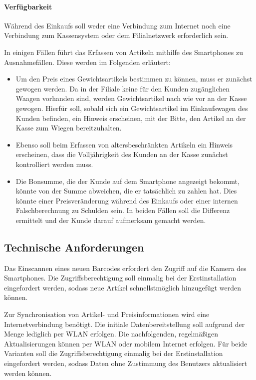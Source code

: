 \paragraph{Verfügbarkeit}
Während des Einkaufs soll weder eine Verbindung zum Internet noch eine Verbindung zum Kassensystem oder dem Filialnetzwerk erforderlich sein. 

In einigen Fällen führt das Erfassen von Artikeln mithilfe des Smartphones zu Ausnahmefällen. Diese werden im Folgenden erläutert:

\begin{itemize}
	\item Um den Preis eines Gewichtsartikels bestimmen zu können, muss er zunächst gewogen werden. Da in der Filiale keine für den Kunden zugänglichen Waagen vorhanden sind, werden Gewichtsartikel nach wie vor an der Kasse gewogen. Hierfür soll, sobald sich ein Gewichtsartikel im Einkaufswagen des Kunden befinden, ein Hinweis erscheinen, mit der Bitte, den Artikel an der Kasse zum Wiegen bereitzuhalten.
	\item Ebenso soll beim Erfassen von altersbeschränkten Artikeln ein Hinweis erscheinen, dass die Volljährigkeit des Kunden an der Kasse zunächst kontrolliert werden muss.
	\item Die Bonsumme, die der Kunde auf dem Smartphone angezeigt bekommt, könnte von der Summe abweichen, die er tatsächlich zu zahlen hat. Dies könnte einer Preisveränderung während des Einkaufs oder einer internen Falschberechnung zu Schulden sein. In beiden Fällen soll die Differenz ermittelt und der Kunde darauf aufmerksam gemacht werden.
\end{itemize}

\subsection{Technische Anforderungen}
Das Einscannen eines neuen Barcodes erfordert den Zugriff auf die Kamera des Smartphones. Die Zugriffsberechtigung soll einmalig bei der Erstinstallation eingefordert werden, sodass neue Artikel schnellstmöglich hinzugefügt werden können.

Zur Synchronisation von Artikel- und Preisinformationen wird eine Internetverbindung benötigt. Die initiale Datenbereitstellung soll aufgrund der Menge lediglich per WLAN erfolgen. Die nachfolgenden, regelmäßigen Aktualisierungen können per WLAN oder mobilem Internet erfolgen. Für beide Varianten soll die Zugriffsberechtigung einmalig bei der Erstinstallation eingefordert werden, sodass Daten ohne Zustimmung des Benutzers aktualisiert werden können.

